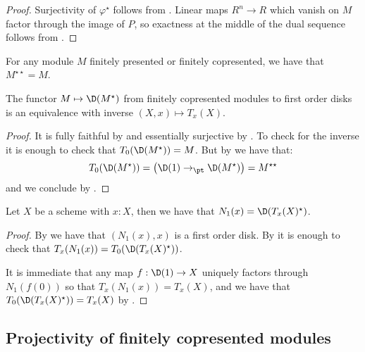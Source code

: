 \begin{proof}
  Surjectivity of $\varphi^\star$ follows from .
  Linear maps $R^n\to R$ which vanish on $M$ factor through the image of $P$, so exactness at the middle of the dual sequence follows from .
\end{proof}

\begin{corollary}\label{double-dual-identity}
For any module $M$ finitely presented or finitely copresented, we have that $M^{\star\star}=M$.
\end{corollary}

\begin{lemma}\label{equivalence-modules-disks}
  The functor $M\mapsto \D(M^\star)$ from finitely copresented modules to first order disks is an equivalence with inverse $(X,x)\mapsto T_x(X)$.
\end{lemma}

\begin{proof}
It is fully faithful by  and essentially surjective by . To check for the inverse it is enough to check that $T_0(\D(M^\star)) = M$. But by  we have that: 
\[T_0(\D(M^\star)) = \left(\D(1)\to_\pt \D(M^{\star})\right) = M^{\star\star}\] 
and we conclude by .
\end{proof}

\begin{lemma}\label{duality-infinitesimal-tangent}
Let $X$ be a scheme with $x:X$, then we have that $N_1(x) = \D(T_x(X)^\star)$.
\end{lemma}

\begin{proof}
By  we have that $(N_1(x),x)$ is a first order disk. By  it is enough to check that $T_x(N_1(x)) = T_0(\D(T_x(X)^\star))$. 

It is immediate that any map $f:\D(1)\to X$ uniquely factors through $N_1(f(0))$ so that $T_x(N_1(x)) = T_x(X)$, and we have that $T_0(\D(T_x(X)^\star)) = T_x(X)$ by .
\end{proof}


\subsection{Projectivity of finitely copresented modules}

